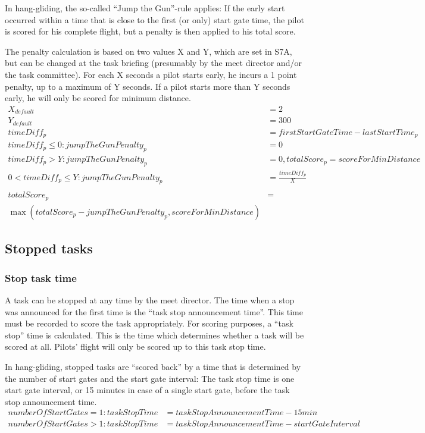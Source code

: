 \documentclass{article}
\begin{document}
\begin{hg}
In hang-gliding, the so-called “Jump the Gun”-rule applies: If the early start
occurred within a time that is close to the first (or only) start gate time,
the pilot is scored for his complete flight, but a penalty is then applied to
his total score.

The penalty calculation is based on two values X and Y, which are set in S7A,
but can be changed at the task briefing (presumably by the meet director and/or
the task committee). For each X seconds a pilot starts early, he incurs
a 1 point penalty, up to a maximum of Y seconds. If a pilot starts more than
Y seconds early, he will only be scored for minimum distance.
\begin{align*}
    X_{default} &= 2 \\
    Y_{default} &= 300 \\
    timeDiff_p &= firstStartGateTime - lastStartTime_p \\
    timeDiff_p \leq 0 : jumpTheGunPenalty_p &= 0 \\
    timeDiff_p > Y : jumpTheGunPenalty_p &= 0, totalScore_p = scoreForMinDistance \\
    0 < timeDiff_p \leq Y : jumpTheGunPenalty_p &= \frac{timeDiff_p}{X} \\
    \\
    totalScore_p &= \\
    \max(totalScore_p - jumpTheGunPenalty_p, scoreForMinDistance)
\end{align*}
\end{hg}

\subsection{Stopped tasks}
\label{sec:stopped-tasks}
\subsubsection{Stop task time}
\label{sec:stop-task-time}
A task can be stopped at any time by the meet director. The time when a stop
was announced for the first time is the “task stop announcement time”. This
time must be recorded to score the task appropriately. For scoring purposes,
a “task stop” time is calculated. This is the time which determines whether
a task will be scored at all. Pilots’ flight will only be scored up to this
task stop time.

\begin{hg}
In hang-gliding, stopped tasks are “scored back” by a time that is determined
by the number of start gates and the start gate interval: The task stop time is
one start gate interval, or 15 minutes in case of a single start gate, before
the task stop announcement time.
\begin{align*}
    numberOfStartGates = 1 : taskStopTime &= taskStopAnnouncementTime - 15min \\
    numberOfStartGates > 1 : taskStopTime &= taskStopAnnouncementTime - startGateInterval \\
\end{align*}
\end{hg}
\end{document}
